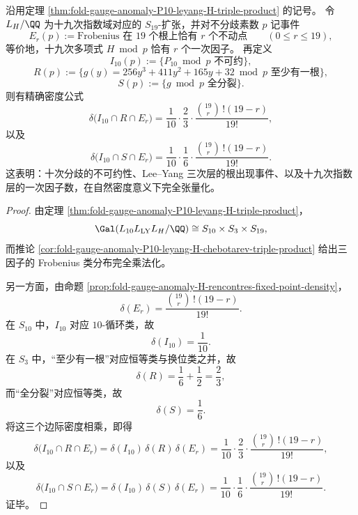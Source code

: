 \begin{theorem}\label{thm:xi-time-part64bb-p10-leyang-h19-fixedpoint-tensorization}
沿用定理 \ref{thm:fold-gauge-anomaly-P10-leyang-H-triple-product} 的记号。
令 \(L_H/\QQ\) 为十九次指数域对应的 \(S_{19}\)-扩张，并对不分歧素数 \(p\) 记事件
\[
E_r(p):=\text{Frobenius 在 \(19\) 个根上恰有 \(r\) 个不动点}
\qquad
(0\le r\le 19),
\]
等价地，十九次多项式 \(H\bmod p\) 恰有 \(r\) 个一次因子。
再定义
\[
I_{10}(p):=\{\text{\(P_{10}\bmod p\) 不可约}\},
\]
\[
R(p):=\{\text{\(g(y)=256y^3+411y^2+165y+32\bmod p\) 至少有一根}\},
\]
\[
S(p):=\{\text{\(g\bmod p\) 全分裂}\}.
\]
则有精确密度公式
\[
\delta\bigl(I_{10}\cap R\cap E_r\bigr)
=
\frac1{10}\cdot \frac23\cdot \frac{\binom{19}{r}\,!(19-r)}{19!},
\]
以及
\[
\delta\bigl(I_{10}\cap S\cap E_r\bigr)
=
\frac1{10}\cdot \frac16\cdot \frac{\binom{19}{r}\,!(19-r)}{19!}.
\]
这表明：十次分歧的不可约性、Lee--Yang 三次层的根出现事件、以及十九次指数层的一次因子数，在自然密度意义下完全张量化。
\end{theorem}
\begin{proof}
由定理 \ref{thm:fold-gauge-anomaly-P10-leyang-H-triple-product}，
\[
\Gal(L_{10}L_{\mathrm{LY}}L_H/\QQ)\cong S_{10}\times S_3\times S_{19},
\]
而推论 \ref{cor:fold-gauge-anomaly-P10-leyang-H-chebotarev-triple-product} 给出三因子的 Frobenius 类分布完全乘法化。

另一方面，由命题 \ref{prop:fold-gauge-anomaly-H-rencontres-fixed-point-density}，
\[
\delta(E_r)=\frac{\binom{19}{r}\,!(19-r)}{19!}.
\]
在 \(S_{10}\) 中，\(I_{10}\) 对应 \(10\)-循环类，故
\[
\delta(I_{10})=\frac1{10}.
\]
在 \(S_3\) 中，“至少有一根”对应恒等类与换位类之并，故
\[
\delta(R)=\frac16+\frac12=\frac23,
\]
而“全分裂”对应恒等类，故
\[
\delta(S)=\frac16.
\]
将这三个边际密度相乘，即得
\[
\delta\bigl(I_{10}\cap R\cap E_r\bigr)
=
\delta(I_{10})\,\delta(R)\,\delta(E_r)
=
\frac1{10}\cdot \frac23\cdot \frac{\binom{19}{r}\,!(19-r)}{19!},
\]
以及
\[
\delta\bigl(I_{10}\cap S\cap E_r\bigr)
=
\delta(I_{10})\,\delta(S)\,\delta(E_r)
=
\frac1{10}\cdot \frac16\cdot \frac{\binom{19}{r}\,!(19-r)}{19!}.
\]
证毕。
\end{proof}

\endinput
